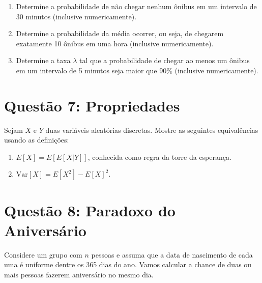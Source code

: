 \documentclass[12 pt]{article}
\begin{document}
\begin{enumerate}
    \item Determine a probabilidade de não chegar nenhum ônibus em um intervalo de 30 minutos (inclusive
          numericamente).
          \begin{tcolorbox}[colframe=black, title=Resposta:]

          \end{tcolorbox}
    \item Determine a probabilidade da média ocorrer, ou seja, de chegarem exatamente 10 ônibus em uma
          hora (inclusive numericamente).
          \begin{tcolorbox}[colframe=black, title=Resposta:]

          \end{tcolorbox}
    \item Determine a taxa $\lambda$ tal que a probabilidade de chegar ao menos um ônibus em um intervalo de 5
          minutos seja maior que 90\% (inclusive numericamente).
          \begin{tcolorbox}[colframe=black, title=Resposta:]

          \end{tcolorbox}
\end{enumerate}

\section*{Questão 7: Propriedades}
Sejam $X$ e $Y$ duas variáveis aleatórias discretas. Mostre as seguintes equivalências usando as definições:

\begin{enumerate}
    \item $E[X] = E[E[X|Y]]$, conhecida como regra da torre da esperança.
    \begin{tcolorbox}[colframe=black, title=Resposta:]

    \end{tcolorbox}
    \item $\text{Var}[X] = E[X^2] - E[X]^2$.
    \begin{tcolorbox}[colframe=black, title=Resposta:]

    \end{tcolorbox}
\end{enumerate}

\section*{Questão 8: Paradoxo do Aniversário}
Considere um grupo com $n$ pessoas e assuma que a data de nascimento de cada uma é uniforme dentre
os 365 dias do ano. Vamos calcular a chance de duas ou mais pessoas fazerem aniversário no mesmo dia.
\end{document}
